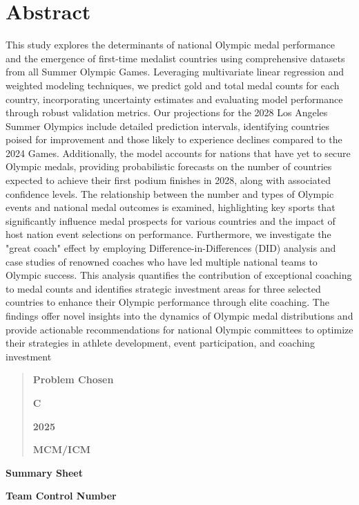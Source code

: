 \documentclass[12pt,a4paper]{article}
\renewenvironment{quote}{\begin{quotation}}{\end{quotation}}  %
\begin{document}
\section*{Abstract}
This study explores the determinants of national Olympic medal
    performance and the emergence of first-time medalist countries using
    comprehensive datasets from all Summer Olympic Games. Leveraging
    multivariate linear regression and weighted modeling techniques, we
    predict gold and total medal counts for each country, incorporating
    uncertainty estimates and evaluating model performance through robust
    validation metrics. Our projections for the 2028 Los Angeles Summer
    Olympics include detailed prediction intervals, identifying countries
    poised for improvement and those likely to experience declines compared
    to the 2024 Games. Additionally, the model accounts for nations that
    have yet to secure Olympic medals, providing probabilistic forecasts on
    the number of countries expected to achieve their first podium finishes
    in 2028, along with associated confidence levels. The relationship
    between the number and types of Olympic events and national medal
    outcomes is examined, highlighting key sports that significantly
    influence medal prospects for various countries and the impact of host
    nation event selections on performance. Furthermore, we investigate the
    "great coach" effect by employing Difference-in-Differences (DID)
    analysis and case studies of renowned coaches who have led multiple
    national teams to Olympic success. This analysis quantifies the
    contribution of exceptional coaching to medal counts and identifies
    strategic investment areas for three selected countries to enhance their
    Olympic performance through elite coaching. The findings offer novel
    insights into the dynamics of Olympic medal distributions and provide
    actionable recommendations for national Olympic committees to optimize
    their strategies in athlete development, event participation, and
    coaching investment
\begin{quote}
    \textbf{Problem Chosen}
    
    \textbf{C}
    
    \textbf{2025}
    
    \textbf{MCM/ICM}
    \end{quote}
    
    \textbf{Summary Sheet}
    
    \textbf{Team Control Number}
    
\end{document}
